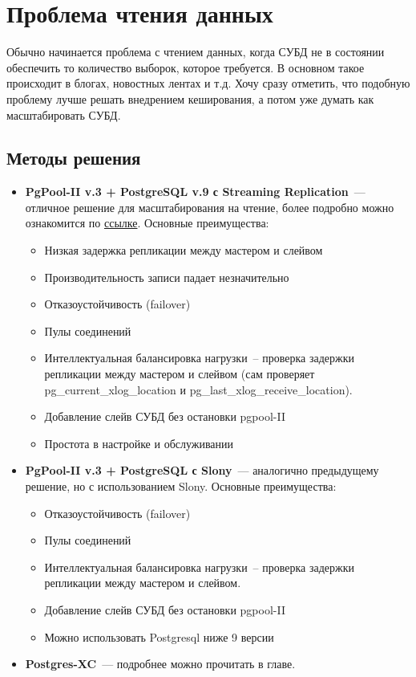 \section{Проблема чтения данных}

Обычно начинается проблема с чтением данных, когда СУБД не в состоянии обеспечить то количество выборок, которое требуется. 
В основном такое происходит в блогах, новостных лентах и т.д. Хочу сразу отметить, что подобную проблему лучше решать 
внедрением кеширования, а потом уже думать как масштабировать СУБД.

\subsection{Методы решения}

\begin{itemize}
\item \textbf{PgPool-II v.3 + PostgreSQL v.9 с Streaming Replication}~--- отличное решение для масштабирования на чтение, 
более подробно можно ознакомится по \href{http://pgpool.projects.pgfoundry.org/contrib\_docs/simple\_sr\_setting/index.html}{ссылке}. 
Основные преимущества:
\begin{itemize}
\item Низкая задержка репликации между мастером и слейвом
\item Производительность записи падает незначительно
\item Отказоустойчивость (failover)
\item Пулы соединений
\item Интеллектуальная балансировка нагрузки~-- проверка задержки репликации между мастером и слейвом (сам проверяет pg\_current\_xlog\_location и pg\_last\_xlog\_receive\_location).
\item Добавление слейв СУБД без остановки pgpool-II
\item Простота в настройке и обслуживании
\end{itemize}

\item \textbf{PgPool-II v.3 + PostgreSQL с Slony}~--- аналогично предыдущему решение, но с использованием Slony.
Основные преимущества:
\begin{itemize}
\item Отказоустойчивость (failover)
\item Пулы соединений
\item Интеллектуальная балансировка нагрузки~-- проверка задержки репликации между мастером и слейвом.
\item Добавление слейв СУБД без остановки pgpool-II
\item Можно использовать Postgresql ниже 9 версии
\end{itemize}

\item \textbf{Postgres-XC}~--- подробнее можно прочитать в  главе.
\end{itemize}
